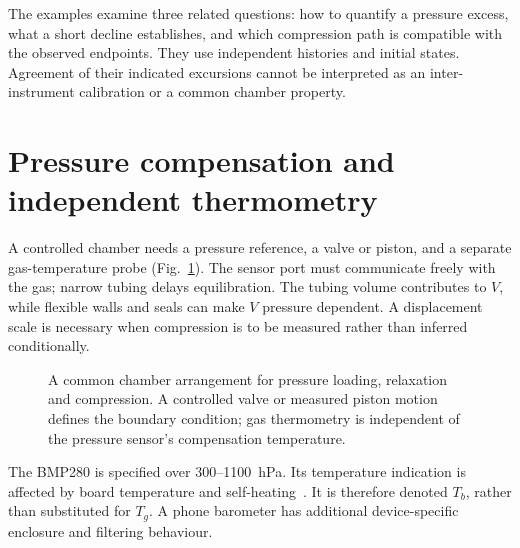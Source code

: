 The examples examine three related questions: how to quantify a pressure excess, what a short decline establishes, and which compression path is compatible with the observed endpoints. They use independent histories and initial states. Agreement of their indicated excursions cannot be interpreted as an inter-instrument calibration or a common chamber property.

\section{Pressure compensation and independent thermometry}
A controlled chamber needs a pressure reference, a valve or piston, and a separate gas-temperature probe (Fig.~\ref{fig:mission-to-mars-apparatus}). The sensor port must communicate freely with the gas; narrow tubing delays equilibration. The tubing volume contributes to $V$, while flexible walls and seals can make $V$ pressure dependent. A displacement scale is necessary when compression is to be measured rather than inferred conditionally.

\begin{figure}[t]
\centering
{}
\caption{A common chamber arrangement for pressure loading, relaxation and compression. A controlled valve or measured piston motion defines the boundary condition; gas thermometry is independent of the pressure sensor's compensation temperature.}
\label{fig:mission-to-mars-apparatus}
\end{figure}

The BMP280 is specified over 300--1100~hPa. Its temperature indication is affected by board temperature and self-heating~\cite{bmp280}. It is therefore denoted $T_b$, rather than substituted for $T_g$. A phone barometer has additional device-specific enclosure and filtering behaviour.

